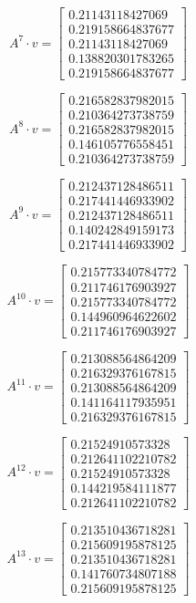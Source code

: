 \documentclass{article}
\begin{document}
$$A^{7} \cdot v = \begin{bmatrix}
0.21143118427069\\
0.219158664837677\\
0.21143118427069\\
0.138820301783265\\
0.219158664837677
\end{bmatrix}
$$

$$A^{8} \cdot v = \begin{bmatrix}
0.216582837982015\\
0.210364273738759\\
0.216582837982015\\
0.146105776558451\\
0.210364273738759
\end{bmatrix}
$$

$$A^{9} \cdot v = \begin{bmatrix}
0.212437128486511\\
0.217441446933902\\
0.212437128486511\\
0.140242849159173\\
0.217441446933902
\end{bmatrix}
$$

$$A^{10} \cdot v = \begin{bmatrix}
0.215773340784772\\
0.211746176903927\\
0.215773340784772\\
0.144960964622602\\
0.211746176903927
\end{bmatrix}
$$

$$A^{11} \cdot v = \begin{bmatrix}
0.213088564864209\\
0.216329376167815\\
0.213088564864209\\
0.141164117935951\\
0.216329376167815
\end{bmatrix}
$$

$$A^{12} \cdot v = \begin{bmatrix}
0.21524910573328\\
0.212641102210782\\
0.21524910573328\\
0.144219584111877\\
0.212641102210782
\end{bmatrix}
$$

$$A^{13} \cdot v = \begin{bmatrix}
0.213510436718281\\
0.215609195878125\\
0.213510436718281\\
0.141760734807188\\
0.215609195878125
\end{bmatrix}
$$
\end{document}
